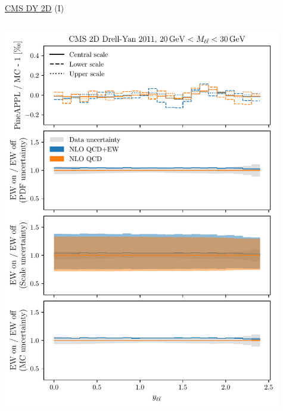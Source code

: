 \begin{frame}{\href{https://arxiv.org/abs/1412.1115}{CMS DY 2D} (I)}
\fontsize{9}{11}\selectfont
\begin{columns}
\begin{column}{0.5\textwidth}
\includegraphics[width=0.95\textwidth]{ew_corrections/figures/pineappl_CMSDY2D11_bin1}
\end{column}
\begin{column}{0.5\textwidth}

\end{column}
\end{columns}
\end{frame}
